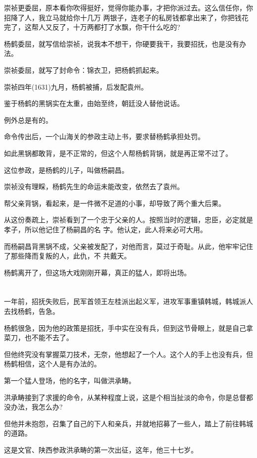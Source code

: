 \documentclass[11pt,a4paper,onecolumn]{article}
\begin{document}
崇祯更委屈，原本看你吹得挺好，觉得你能办事，才把你派过去。这么信任你，你招降了人，我立马就给你十几万
两银子，连老子的私房钱都拿出来了，你把钱花完了，这帮人又反了，十万两都打了水飘，你干什么吃的?

杨鹤委屈，就写信给崇祯，说我本不想干，你硬要我干，我要招抚，也是没有办法。

崇祯委屈，就写了封命令：锦衣卫，把杨鹤抓起来。

崇祯四年(1631)九月，杨鹤被捕，后发配袁州。

鉴于杨鹤的黑锅实在太重，由始至终，朝廷没人替他说话。

例外总是有的。

命令传出后，一个山海关的参政主动上书，要求替杨鹤承担处罚。

如此黑锅都敢背，是不正常的，但这个人帮杨鹤背锅，就是再正常不过了。

这位参政，是杨鹤的儿子，叫做杨嗣昌。

崇祯没有理睬，杨鹤先生的命运未能改变，依然去了袁州。

帮父亲背锅，看起来，是一件微不足道的小事，却导致了两个重大后果。

从这份奏疏上，崇祯看到了一个忠于父亲的人。按照当时的逻辑，忠臣，必定就是孝子，所以他记住了杨嗣昌的名
字。他认定，此人将来必可大用。

而杨嗣昌背黑锅不成，父亲被发配了，对他而言，莫过于奇耻。从此，他牢牢记住了那些降而复叛的人，此仇，不
共戴天。

杨鹤离开了，但这场大戏刚刚开幕，真正的猛人，即将出场。

\section[\thesection]{}

一年前，招抚失败后，民军首领王左桂派出起义军，进攻军事重镇韩城，韩城派人去找杨鹤，告急。

杨鹤很急，因为他的政策是招抚，手中实在没有兵，但到这节骨眼上，就是自己拿菜刀，也不能不去了。

但他终究没有掌握菜刀技术，无奈，他想起了一个人。这个人的手上也没有兵，但杨鹤相信，这个人是有办法的。

第一个猛人登场，他的名字，叫做洪承畴。

洪承畴接到了求援的命令，从某种程度上说，这是个相当扯淡的命令，你是总督都没办法，我怎么办?

但他并未抱怨，召集了自己的下人和亲兵，并就地招募了一些人，踏上了前往韩城的道路。

这是文官、陕西参政洪承畴的第一次出征，这年，他三十七岁。
\end{document}
